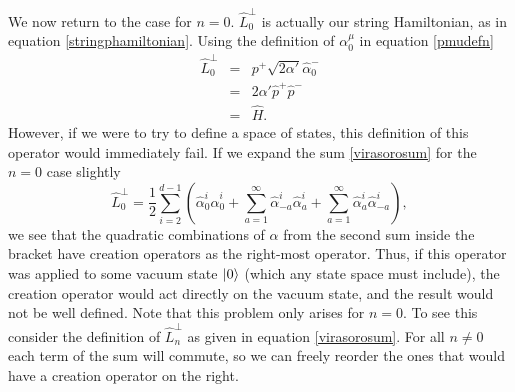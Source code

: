 \documentclass[a4paper,12pt]{article}
\numberwithin{equation}{section}
\begin{document}
We now return to the case for $n=0$. $\hat{L}_0^\perp$ is actually our string Hamiltonian, as in equation \ref{stringphamiltonian}. Using the definition of $\alpha_0^\mu$ in equation \ref{pmudefn}
\begin{eqnarray*}
\hat{L}_0^\perp &=& p^+\sqrt{2\alpha'}\hat{\alpha}_0^-\\
&=& 2\alpha'\hat{p}^+\hat{p}^-\\ &=& \hat{H}. \end{eqnarray*}
However, if we were to try to define a space of states, this definition of this operator would immediately fail. If we expand the sum \ref{virasorosum} for the $n=0$ case slightly
\begin{equation}
\hat{L}_0^\perp = \frac{1}{2}\sum_{i=2}^{d-1}\left(\hat{\alpha}_0^i\hat{\alpha}_0^i + \sum_{a=1}^\infty\hat{\alpha}_{-a}^i\hat{\alpha}_a^i + \sum_{a=1}^\infty\hat{\alpha}_a^i\hat{\alpha}_{-a}^i\right),
\end{equation} 
we see that the quadratic combinations of $\hat{\alpha}$ from the second sum inside the bracket have creation operators as the right-most operator. Thus, if this operator was applied to some vacuum state $\ket{0}$ (which any state space must include), the creation operator would act directly on the vacuum state, and the result would not be well defined\cite{peskin}. Note that this problem only arises for $n=0$. To see this consider the definition of $\hat{L}_n^\perp$ as given in equation \ref{virasorosum}. For all $n\ne0$ each term of the sum will commute, so we can freely reorder the ones that would have a creation operator on the right.
 
\end{document}
